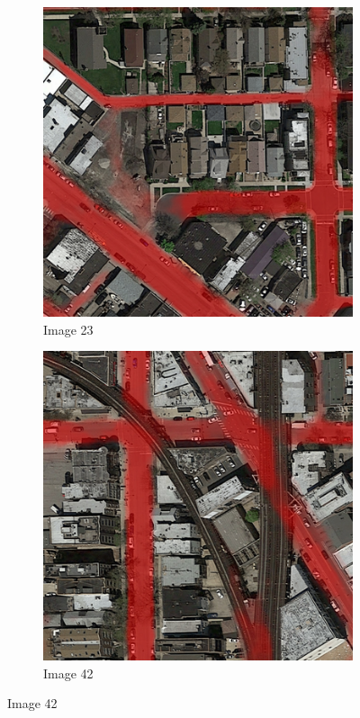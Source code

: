 \documentclass[10pt,conference,compsocconf]{IEEEtran}
\begin{document}
\begin{figure}
    \centering
    \begin{subfigure}[b]{0.3\columnwidth}
      \caption*{Image 23}
        \includegraphics[width=\columnwidth]{figures/training_hard/eval_overlays_pred_002.png}
    \end{subfigure}
    \begin{subfigure}[b]{0.3\columnwidth}
    \caption*{Image 42}
        \includegraphics[width=\textwidth]{figures/training_hard/eval_overlays_pred_003.png}

\end{subfigure}
\end{figure}
\end{document}
